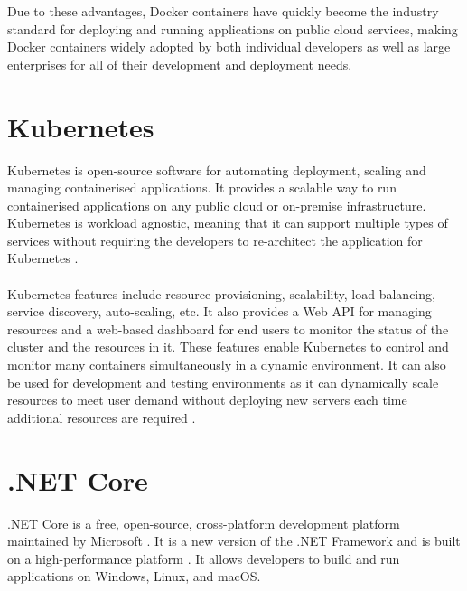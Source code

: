 \documentclass[BIF,Bachelor,nenglish]{twbook}%
\begin{document}
\noindent
Due to these advantages, Docker containers have quickly become the industry standard for deploying and running applications on public cloud services, making Docker containers widely adopted by both individual developers as well as large enterprises for all of their development and deployment needs.

\section{Kubernetes}
Kubernetes is open-source software for automating deployment, scaling and managing containerised applications. It provides a scalable way to run containerised applications on any public cloud or on-premise infrastructure. Kubernetes is workload agnostic, meaning that it can support multiple types of services without requiring the developers to re-architect the application for Kubernetes \cite{luk2018}.
\\
\\
Kubernetes features include resource provisioning, scalability, load balancing, service discovery, auto-scaling, etc. It also provides a Web \ac{API} for managing resources and a web-based dashboard for end users to monitor the status of the cluster and the resources in it. These features enable Kubernetes to control and monitor many containers simultaneously in a dynamic environment. It can also be used for development and testing environments as it can dynamically scale resources to meet user demand without deploying new servers each time additional resources are required \cite{kubernetes}.



\section{.NET Core}
.NET Core is a free, open-source, cross-platform development platform maintained by Microsoft \cite{dotnetintro}. It is a new version of the .NET Framework and is built on a high-performance platform \cite{dotnetintro}. It allows developers to build and run applications on Windows, Linux, and macOS.
\end{document}
